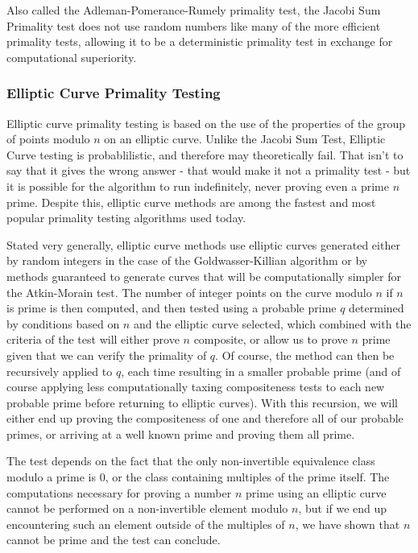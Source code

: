 \documentclass{article}
\begin{document}
 \par Also called the Adleman-Pomerance-Rumely primality test,  the Jacobi Sum Primality test does not use random numbers like many of the more efficient primality tests, allowing it to be a deterministic primality test in exchange for computational superiority.

\subsubsection{Elliptic Curve Primality Testing}

Elliptic curve primality testing is based on the use of the properties of the group of points modulo $n$ on an elliptic curve. Unlike the Jacobi Sum Test, Elliptic Curve testing is probablilistic, and therefore may theoretically fail. That isn't to say that it gives the wrong answer - that would make it not a primality test - but it is possible for the algorithm to run indefinitely, never proving even a prime $n$ prime.  Despite this, elliptic curve methods are among the fastest and most popular primality testing algorithms used today.
\par Stated very generally, elliptic curve methods use elliptic curves generated either by random integers in the case of the Goldwasser-Killian algorithm or by methods guaranteed to generate curves that will be computationally simpler for the Atkin-Morain test. The number of integer points on the curve modulo $n$ if $n$ is prime is then computed, and then tested using a probable prime $q$ determined by conditions based on $n$ and the elliptic curve selected, which combined with the criteria of the test will either prove $n$ composite, or allow us to prove $n$ prime given that we can verify the primality of $q$. Of course, the method can then be recursively applied to $q$, each time resulting in a smaller probable prime (and of course applying less computationally taxing compositeness tests to each new probable prime before returning to elliptic curves). With this recursion, we will either end up proving the compositeness of one and therefore all of our probable primes, or arriving at a well known prime and proving them all prime. 
\par The test depends on the fact that the only non-invertible equivalence class modulo a prime is $0$, or the class containing multiples of the prime itself. The computations necessary for proving a number $n$ prime using an elliptic curve cannot be performed on a non-invertible element modulo $n$,  but if we end up encountering such an element outside of the multiples of $n$, we have shown that $n$ cannot be prime and the test can conclude. 




\end{document}
